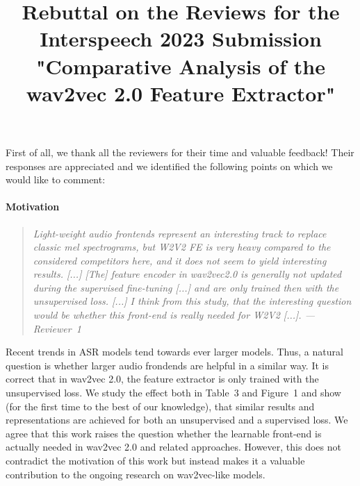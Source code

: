 \documentclass[11pt]{extarticle}
\title{Rebuttal on the Reviews for the Interspeech 2023 Submission \\ "Comparative Analysis of the wav2vec 2.0 Feature Extractor"}
\date{}
\begin{document}
\maketitle\vspace{-10mm}
First of all, we thank all the reviewers for their time and valuable feedback! Their responses are appreciated and we identified the following points on which we would like to comment:

\paragraph{Motivation}
\begin{quote}\textit{
Light-weight audio frontends represent an interesting track to replace classic mel spectrograms, but W2V2 FE is very heavy compared to the considered competitors here, and it does not seem to yield interesting results.
[...]
[The] feature encoder in wav2vec2.0 is generally not updated during the supervised fine-tuning [...] and are only trained then with the unsupervised loss.
[...]
I think from this study, that the interesting question would be whether this front-end is really needed for W2V2 [...].
--- Reviewer~1
}\end{quote}
Recent trends in ASR models tend towards ever larger models.
Thus, a natural question is whether larger audio frondends are helpful in a similar way.
It is correct that in wav2vec 2.0, the feature extractor is only trained with the unsupervised loss.
We study the effect both in Table~3 and Figure~1 and show (for the first time to the best of our knowledge), that similar results and representations are achieved for both an unsupervised and a supervised loss.
We agree that this work raises the question whether the learnable front-end is actually needed in wav2vec 2.0 and related approaches.
However, this does not contradict the motivation of this work but instead makes it a valuable contribution to the ongoing research on wav2vec-like models.
\end{document}
